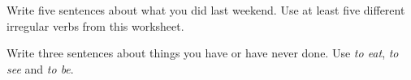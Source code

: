 \documentclass[11pt]{article}
\begin{document}
%
  {Write five sentences about what you did last weekend. Use at least five
   different irregular verbs from this worksheet.}


%
  {Write three sentences about things you have or have never done. Use
   \textit{to eat}, \textit{to see} and \textit{to be}.}

\end{document}

